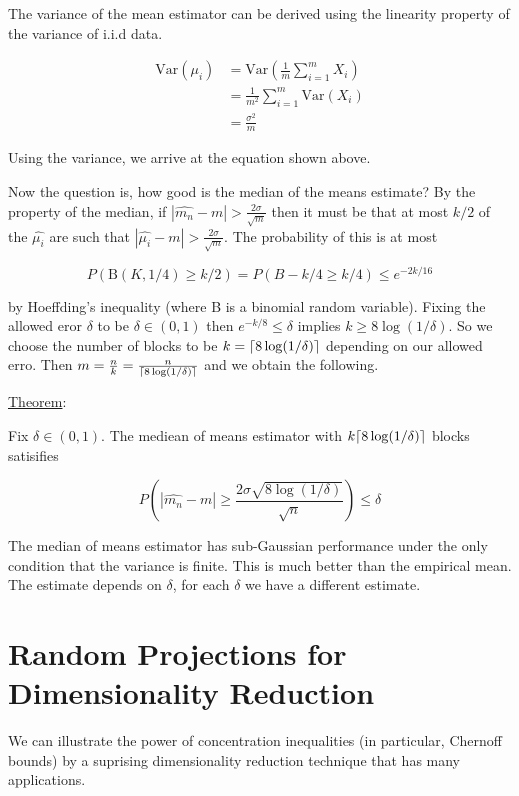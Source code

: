 \documentclass[12pt, authoryear]{elsarticle}
\DeclarePairedDelimiter{\ceil}{\lceil}{\rceil}
\begin{document}
The variance of the mean estimator can be derived using the linearity property of the variance of i.i.d data.

\begin{equation*} 
\begin{split}
\text{Var}(\mu_i) &= \text{Var}(\frac{1}{m} \sum_{i=1}^{m}X_i) \\
&= \frac{1}{m^2} \sum_{i=1}^{m} \text{Var}(X_i) \\
&= \frac{\sigma^2}{m}
\end{split}
\end{equation*}

Using the variance, we arrive at the equation shown above. 


Now the question is, how good is the median of the means estimate? By the property of the median, if $|\hat{m_n} - m | > \frac{2 \sigma }{\sqrt{m}} $ then it must be that at most $k/2$ of the $\hat{\mu_i}$ are such that $|\hat{\mu_i} - m | > \frac{2 \sigma }{\sqrt{m}} $. The probability of this is at most

$$P( \text{B}(K,1/4) \geq k/2) = P(B - k/4 \geq k/4) \leq e^{-2k/16}$$

by Hoeffding's inequality (where B is a binomial random variable). Fixing the allowed eror $\delta$ to be $\delta \in (0,1)$ then $e^{-k/8} \leq \delta$ implies $k\geq 8 \log(1/\delta)$. So we choose the number of blocks to be $k = \ceil{8\log(1/\delta) }$ depending on our allowed erro. Then $ m= \frac{n}{k} = \frac{n}{\ceil{8\log(1/\delta) }}$ and we obtain the following.

\underline{Theorem}:

Fix $\delta \in (0,1)$. The mediean of means estimator with $k \ceil{8\log(1/\delta)}$ blocks satisifies 

$$P(|\hat{m_n} - m | \geq \frac{2\sigma \sqrt{8 \log(1/\delta)}}{\sqrt{n}}) \leq \delta $$

The median of means estimator has sub-Gaussian performance under the only condition that the variance is finite. This is much better than the empirical mean. The estimate depends on $\delta$, for each $\delta$ we have a different estimate. 

\section{Random Projections for Dimensionality Reduction}

We can illustrate the power of concentration inequalities (in particular, Chernoff bounds) by a suprising dimensionality reduction technique that has many applications. 
\end{document}
